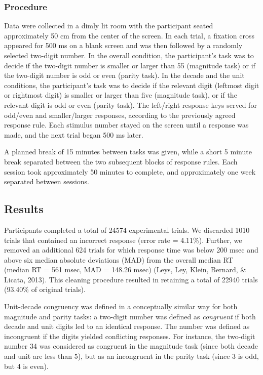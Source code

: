 \documentclass[english,man]{apa6}
\theoremstyle{definition}
\theoremstyle{definition}
\theoremstyle{definition}
\theoremstyle{remark}
\begin{document}
\subsubsection{Procedure}\label{procedure}

Data were collected in a dimly lit room with the participant seated
approximately 50 cm from the center of the screen. In each trial, a
fixation cross appeared for 500 ms on a blank screen and was then
followed by a randomly selected two-digit number. In the overall
condition, the participant's task was to decide if the two-digit number
is smaller or larger than 55 (magnitude task) or if the two-digit number
is odd or even (parity task). In the decade and the unit conditions, the
participant's task was to decide if the relevant digit (leftmost digit
or rightmost digit) is smaller or larger than five (magnitude task), or
if the relevant digit is odd or even (parity task). The left/right
response keys served for odd/even and smaller/larger responses,
according to the previously agreed response rule. Each stimulus number
stayed on the screen until a response was made, and the next trial began
500 ms later.

A planned break of 15 minutes between tasks was given, while a short 5
minute break separated between the two subsequent blocks of response
rules. Each session took approximately 50 minutes to complete, and
approximately one week separated between sessions.

\subsection{Results}\label{results}

Participants completed a total of 24574 experimental trials. We
discarded 1010 trials that contained an incorrect response (error rate =
4.11\%). Further, we removed an additional 624 trials for which response
time was below 200 msec and above six median absolute deviations (MAD)
from the overall median RT (median RT = 561 msec, MAD = 148.26 msec)
(Leys, Ley, Klein, Bernard, \& Licata, 2013). This cleaning procedure
resulted in retaining a total of 22940 trials (93.40\% of original
trials).

Unit-decade congruency was defined in a conceptually similar way for
both magnitude and parity tasks: a two-digit number was defined as
\emph{congruent} if both decade and unit digits led to an identical
response. The number was defined as incongruent if the digits yielded
conflicting responses. For instance, the two-digit number 34 was
considered as congruent in the magnitude task (since both decade and
unit are less than 5), but as an incongruent in the parity task (since 3
is odd, but 4 is even).
\end{document}
